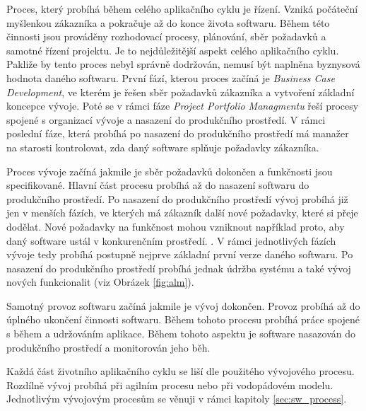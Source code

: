 \documentclass[czech,master,public,dept460,male,cpdeclaration,oneside]{diploma}
\begin{document}
Proces, který probíhá během celého aplikačního cyklu je řízení. Vzniká počáteční myšlenkou zákazníka a pokračuje až do konce života softwaru. Během této činnosti jsou prováděny rozhodovací procesy, plánování, sběr požadavků a samotné řízení projektu. Je to nejdůležitější aspekt celého aplikačního cyklu. Pakliže by tento proces nebyl správně dodržován, nemusí být naplněna byznysová hodnota daného softwaru. \cite{alm_chappell} První fází, kterou proces začíná je \textit{Business Case Development}, ve kterém je řešen sběr požadavků zákazníka a vytvoření základní koncepce vývoje. Poté se v rámci fáze \textit{Project Portfolio Managmentu} řeší procesy spojené s organizací vývoje a nasazení do produkčního prostředí. V rámci poslední fáze, která probíhá po nasazení do produkčního prostředí má manažer na starosti kontrolovat, zda daný software splňuje požadavky zákazníka.

Proces vývoje začíná jakmile je sběr požadavků dokončen a funkčnosti jsou specifikované. Hlavní část procesu probíhá až do nasazení softwaru do produkčního prostředí. Po nasazení do produkčního prostředí vývoj probíhá již jen v menších fázích, ve kterých má zákazník další nové požadavky, které si přeje dodělat. Nové požadavky na funkčnost mohou vzniknout například proto, aby daný software ustál v konkurenčním prostředí. \cite{alm_chappell}. V rámci jednotlivých fázích vývoje tedy probíhá postupně nejprve základní první verze daného softwaru. Po nasazení do produkčního prostředí probíhá jednak údržba systému a také vývoj nových funkcionalit (viz Obrázek \ref{fig:alm}).

Samotný provoz softwaru začíná jakmile je vývoj dokončen. Provoz probíhá až do úplného ukončení činnosti softwaru. Během tohoto procesu probíhá práce spojené s během a udržováním aplikace. Během tohoto aspektu je software nasazován do produkčního prostředí a monitorován jeho běh.  \cite{alm_chappell} 

Každá část životního aplikačního cyklu se liší dle použitého vývojového procesu. Rozdílně vývoj probíhá při agilním procesu nebo při vodopádovém modelu. Jednotlivým vývojovým procesům se věnuji v rámci kapitoly \ref{sec:sw_process}.


\end{document}
